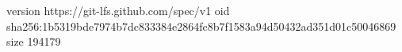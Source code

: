 version https://git-lfs.github.com/spec/v1
oid sha256:1b5319bde7974b7dc833384e2864fc8b7f1583a94d50432ad351d01c50046869
size 194179
